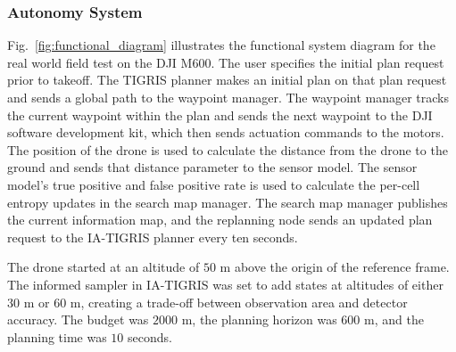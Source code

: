 \subsubsection{Autonomy System}
Fig.~\ref{fig:functional_diagram} illustrates the functional system diagram for the real world field test on the DJI M600. The user specifies the initial plan request prior to takeoff. The TIGRIS planner makes an initial plan on that plan request and sends a global path to the waypoint manager. The waypoint manager tracks the current waypoint within the plan and sends the next waypoint to the DJI software development kit, which then sends actuation commands to the motors. The position of the drone is used to calculate the distance from the drone to the ground and sends that distance parameter to the sensor model. The sensor model's true positive and false positive rate is used to calculate the per-cell entropy updates in the search map manager. The search map manager publishes the current information map, and the replanning node sends an updated plan request to the IA-TIGRIS planner every ten seconds.

The drone started at an altitude of $50$ m above the origin of the reference frame. The informed sampler in IA-TIGRIS was set to add states at altitudes of either $30$ m or $60$ m, creating a trade-off between observation area and detector accuracy. The budget was $2000$ m, the planning horizon was $600$ m, and the planning time was $10$ seconds. 


